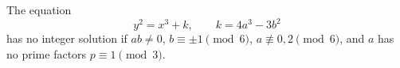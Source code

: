 \begin{proposition}
    The equation
\[
    y^2=x^3+k,\qquad k=4a^3-3b^2
\]
    has no integer solution if $ab\ne0$, $b\equiv\pm1\pmod6$, $a\not\equiv0,2\pmod6$, and $a$ has no prime factors $p\equiv1\pmod3$.
\end{proposition}
